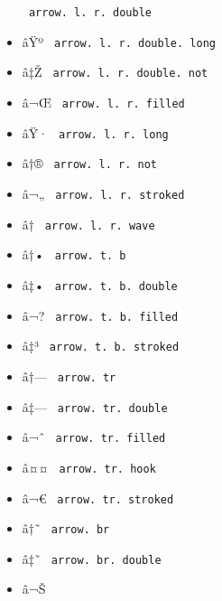 \begin{itemize}
{  \texttt{\ arrow.\ l.\ r.\ double\ }}
\item
  \label{symbol-arrow.l.r.double.long}{{ âŸº }
  \texttt{\ arrow.\ l.\ r.\ double.\ long\ }}
\item
  \label{symbol-arrow.l.r.double.not}{{ â‡Ž }
  \texttt{\ arrow.\ l.\ r.\ double.\ not\ }}
\item
  \label{symbol-arrow.l.r.filled}{{ â¬Œ }
  \texttt{\ arrow.\ l.\ r.\ filled\ }}
\item
  \label{symbol-arrow.l.r.long}{{ âŸ· }
  \texttt{\ arrow.\ l.\ r.\ long\ }}
\item
  \label{symbol-arrow.l.r.not}{{ â†® }
  \texttt{\ arrow.\ l.\ r.\ not\ }}
\item
  \label{symbol-arrow.l.r.stroked}{{ â¬„ }
  \texttt{\ arrow.\ l.\ r.\ stroked\ }}
\item
  \label{symbol-arrow.l.r.wave}{{ â†­ }
  \texttt{\ arrow.\ l.\ r.\ wave\ }}
\item
  \label{symbol-arrow.t.b}{{ â†• }
  \texttt{\ arrow.\ t.\ b\ }}
\item
  \label{symbol-arrow.t.b.double}{{ â‡• }
  \texttt{\ arrow.\ t.\ b.\ double\ }}
\item
  \label{symbol-arrow.t.b.filled}{{ â¬? }
  \texttt{\ arrow.\ t.\ b.\ filled\ }}
\item
  \label{symbol-arrow.t.b.stroked}{{ â‡³ }
  \texttt{\ arrow.\ t.\ b.\ stroked\ }}
\item
  \label{symbol-arrow.tr}{{ â†--- }
  \texttt{\ arrow.\ tr\ }}
\item
  \label{symbol-arrow.tr.double}{{ â‡--- }
  \texttt{\ arrow.\ tr.\ double\ }}
\item
  \label{symbol-arrow.tr.filled}{{ â¬ˆ }
  \texttt{\ arrow.\ tr.\ filled\ }}
\item
  \label{symbol-arrow.tr.hook}{{ â¤¤ }
  \texttt{\ arrow.\ tr.\ hook\ }}
\item
  \label{symbol-arrow.tr.stroked}{{ â¬€ }
  \texttt{\ arrow.\ tr.\ stroked\ }}
\item
  \label{symbol-arrow.br}{{ â†˜ }
  \texttt{\ arrow.\ br\ }}
\item
  \label{symbol-arrow.br.double}{{ â‡˜ }
  \texttt{\ arrow.\ br.\ double\ }}
\item
  \label{symbol-arrow.br.filled}{{ â¬Š }
}
\end{itemize}
